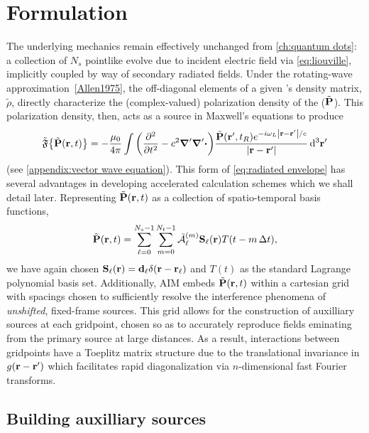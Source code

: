\section{Formulation}

The underlying mechanics remain effectively unchanged from \cref{ch:quantum dots}: a collection of $N_s$ pointlike \qds{} evolve due to incident electric field via \cref{eq:liouville}, implicitly coupled by way of secondary radiated fields.
Under the rotating-wave approximation~\cref{Allen1975}, the off-diagonal elements of a given \qd's density matrix, $\tilde{\rho}$, directly characterize the (complex-valued) polarization density of the \qd ($\tilde{\vb{P}}$).
This polarization density, then, acts as a source in Maxwell's equations to produce
\begin{equation}
  \tilde{\mathfrak{F}}\qty{\tilde{\vb{P}}(\vb{r}, t)} = -\frac{\mu_0}{4\pi} \int \qty(\pdv[2]{t} - c^2 \grad' \grad'\boldsymbol{\cdot}) \frac{\tilde{\vb{P}}(\vb{r}', t_R) e^{-i \omega_L \abs{\vb{r} - \vb{r}'}/c}}{\abs{\vb{r} - \vb{r}'}} \dd[3]{\vb{r}'}
\end{equation}
(see \cref{appendix:vector wave equation}).
This form of \cref{eq:radiated envelope} has several advantages in developing accelerated calculation schemes which we shall detail later.
Representing $\tilde{\vb{P}}(\vb{r}, t)$ as a collection of spatio-temporal basis functions,
\begin{equation}
  \tilde{\vb{P}}(\vb{r}, t) = \sum_{\ell = 0}^{N_s - 1} \sum_{m = 0}^{N_t - 1} \tilde{\mathcal{A}}_\ell^{(m)} \vb{S}_\ell(\vb{r}) T(t - m \, \Delta t),
\end{equation}
we have again chosen $\vb{S}_\ell(\vb{r}) = \vb{d}_\ell \delta(\vb{r} - \vb{r}_\ell)$ and $T(t)$ as the standard Lagrange polynomial basis set.
Additionally, AIM embeds $\tilde{\vb{P}}(\vb{r}, t)$ within a cartesian grid with spacings chosen to sufficiently resolve the interference phenomena of \emph{unshifted}, fixed-frame sources.
This grid allows for the construction of auxilliary sources at each gridpoint, chosen so as to accurately reproduce fields eminating from the primary source at large distances.
As a result, interactions between gridpoints have a Toeplitz matrix structure due to the translational invariance in $g(\vb{r} - \vb{r}')$ which facilitates rapid diagonalization via $n$-dimensional fast Fourier transforms.

\subsection{Building auxilliary sources}

